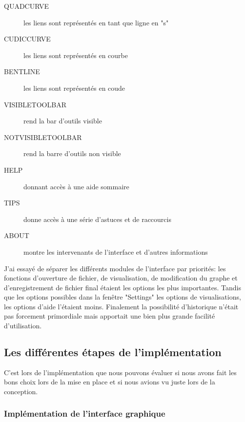 \documentclass[french]{article}
\begin{document}
\begin{description}
        \item [{QUADCURVE}] les liens sont représentés en tant que ligne en "s"

        \item [{CUDICCURVE}]  les liens sont représentés en courbe
        
        \item [{BENTLINE}]    les liens sont représentés en coude

        \item [{VISIBLETOOLBAR}] rend la bar d'outils visible
        
        \item [{NOTVISIBLETOOLBAR}] rend la barre d'outils non visible
        
        \item [{HELP}]      donnant accès à une aide sommaire
        
        \item [{TIPS}]      donne accès à une série d'astuces et de raccourcis
        
        \item [{ABOUT}]   montre les intervenants de l’interface et d'autres informations
       \end{description}

      J'ai essayé de séparer les différents modules de l'interface par priorités:
      les fonctions d'ouverture de fichier, de visualisation, de modification du graphe
      et d'enregistrement de fichier final étaient les options les plus importantes.
      Tandis que les options possibles dans la fenêtre "Settings" les options de visualisations, les options d'aide l'étaient moins. Finalement la possibilité d'historique n'était pas
      forcement primordiale mais apportait une bien plus grande facilité
      d'utilisation.

\subsection{Les différentes étapes de l'implémentation}
  
      C'est lors de l’implémentation que nous pouvons évaluer si nous avons fait les bons choix lors de la mise en place et si nous avions vu juste lors de la conception.

  \subsubsection{Implémentation de l'interface graphique}
\end{document}
